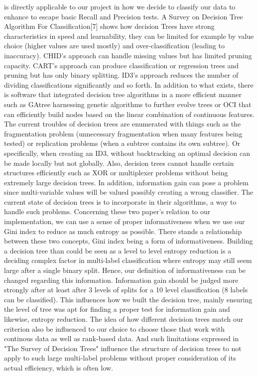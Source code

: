 \documentclass[acmtog, authorversion]{acmart}
\begin{document}
is directly applicable to our project in how we decide to classify our data to enhance to escape basic Recall and Precision tests. 
A Survey on Decision Tree Algorithm For Classification[7] shows how decision Trees have strong characteristics in speed and learnability, they can 
be limited for example by value choice (higher values are used mostly) and over-classification (leading to inaccuracy). CHID’s approach can handle missing 
values but has limited pruning capacity. CART’s approach can produce classification or regression trees and pruning but has only binary splitting. ID3’s 
approach reduces the number of dividing classifications significantly and so forth. In addition to what exists, there is software that integrated decision 
tree algorithms in a more efficient manner such as GAtree harnessing genetic algorithms to further evolve trees or OCI that can efficiently build nodes 
based on the linear combination of continuous features. The current troubles of decision trees are enumerated with things such as the fragmentation 
problem (unnecessary fragmentation when many features being tested) or replication problems (when a subtree contains its own subtree). Or specifically, 
when creating an ID3, without backtracking an optimal decision can be made locally but not globally. Also, decision trees cannot handle certain structures 
efficiently such as XOR or multiplexer problems without being extremely large decision trees. In addition, information gain can pose a problem since 
multi-variable values will be valued possibly creating a wrong classifier. The current state of decision trees is to incorporate in their algorithms, 
a way to handle such problems. Concerning these two paper's relation to our implementation, we can use a sense of proper informativeness when we use our Gini index to reduce as much entropy as possible. There stands a relationship between these two concepts, Gini index being a form of informativeness. Building a decision tree than could be seen as a level to level entropy reduction is a deciding complex factor in multi-label classification where entropy may still seem large after a single binary split. Hence, our definition of informativeness can be changed regarding this information. Information gain should be judged more strongly after at least after 3 levels of splits for a 10 level classification (8 labels can be classified). This influences how we built the decision tree, mainly ensuring the level of tree was apt for finding a proper test for information gain and likewise, entropy reduction. The idea of how different decision trees match our criterion also be influenced to our choice to choose those that work with continous data as well as rank-based data. And such limitations expressed in "The Survey of Decision Trees" influence the structure of decision trees to not apply to such large multi-label problems without proper consideration of its actual efficiency, which is often low. 
\end{document}
